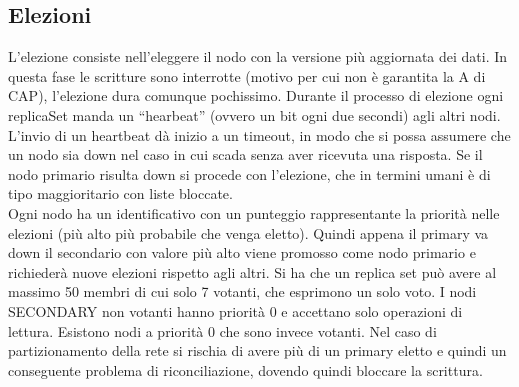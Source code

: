 \subsection{Elezioni}
L’elezione consiste nell’eleggere il nodo con la versione più aggiornata dei dati.
In questa fase le scritture sono interrotte (motivo per cui non è garantita la A di CAP), l’elezione dura comunque pochissimo. Durante il processo di elezione ogni replicaSet manda un “hearbeat” (ovvero un bit ogni due secondi) agli altri nodi. L’invio di un heartbeat dà inizio a un timeout, in modo che si possa assumere che un nodo sia down nel caso in cui scada senza aver ricevuta una risposta. Se il nodo primario risulta down si procede con l’elezione, che in termini umani è di tipo maggioritario con liste bloccate. \\
Ogni nodo ha un identificativo con un punteggio rappresentante la priorità nelle elezioni (più alto più probabile che venga eletto). Quindi appena il primary va down il secondario con valore più alto viene promosso come nodo primario e richiederà nuove elezioni rispetto agli altri. 
Si ha che un replica set può avere al massimo 50 membri di cui solo 7 votanti, che esprimono un solo voto. I nodi SECONDARY non votanti hanno priorità 0 e accettano solo operazioni di lettura. Esistono nodi a priorità 0 che sono invece votanti.
Nel caso di partizionamento della rete si rischia di avere più di un primary eletto e quindi un conseguente problema di riconciliazione, dovendo quindi bloccare la scrittura.

